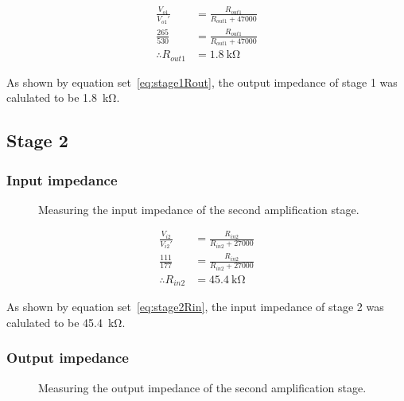 \documentclass[a4paper,11pt]{article}
\begin{document}
            \begin{subequations} \label{eq:stage1Rout}
            \begin{align}
                \frac{V_{o1}}{V_{o1}'} &= \frac{R_{out1}}{R_{out1} + 47000}   \\
                \frac{265}{530} &= \frac{R_{out1}}{R_{out1} + 47000}   \\
                \therefore R_{out1} &= \SI{1.8}{\kilo\ohm}
            \end{align}
            \end{subequations}
            
            As shown by equation set~\ref{eq:stage1Rout}, the output impedance of stage 1 was calulated to be \SI{1.8}{\kilo\ohm}.
        
    \subsection{Stage 2}
        \subsubsection{Input impedance}
            \begin{figure}[h]
            \centering
                
                \caption{Measuring the input impedance of the second amplification stage.}
                \label{fig:stage2inputZ}
            \end{figure}
            
            \begin{subequations} \label{eq:stage2Rin}
            \begin{align}
                \frac{V_{i2}}{V_{i2}'} &= \frac{R_{in2}}{R_{in2} + 27000}   \\
                \frac{111}{177} &= \frac{R_{in2}}{R_{in2} + 27000}   \\
                \therefore R_{in2} &= \SI{45.4}{\kilo\ohm}
            \end{align}
            \end{subequations}
            
            As shown by equation set~\ref{eq:stage2Rin}, the input impedance of stage 2 was calulated to be \SI{45.4}{\kilo\ohm}.
    
        \subsubsection{Output impedance}
            \begin{figure}[h]
            \centering
                
                \caption{Measuring the output impedance of the second amplification stage.}
                \label{fig:stage2outputZ}
            \end{figure}
            
\end{document}
